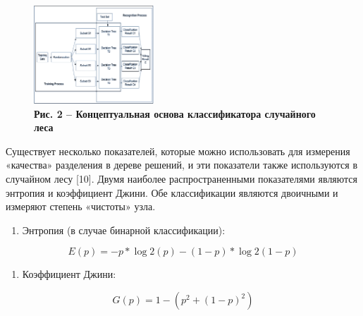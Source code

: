 \begin{figure}[H]
	\centering
	\includegraphics[width=0.4\textwidth]{assets/111}
	\caption*{\bfseries Рис. 2 -- Концептуальная основа классификатора случайного леса}
\end{figure}

\begin{multicols}{2}


Существует несколько показателей, которые можно использовать для
измерения «качества» разделения в дереве решений, и эти показатели также
используются в случайном лесу {[}10{]}. Двумя наиболее распространенными
показателями являются энтропия и коэффициент Джини. Обе классификации
являются двоичными и измеряют степень «чистоты» узла.
\end{multicols}

\begin{enumerate}
\def\labelenumi{\arabic{enumi}.}
\item
  Энтропия (в случае бинарной классификации):
\end{enumerate}
\begin{equation}
	E(p)= - p*\log2(p)-(1-p)*\log2(1-p)
\end{equation}

\begin{enumerate}
\def\labelenumi{\arabic{enumi}.}
\setcounter{enumi}{1}
\item
  Коэффициент Джини:
\end{enumerate}

\begin{equation}
	G(p)= 1 - (p^2 + (1 - p)^2)
\end{equation}

